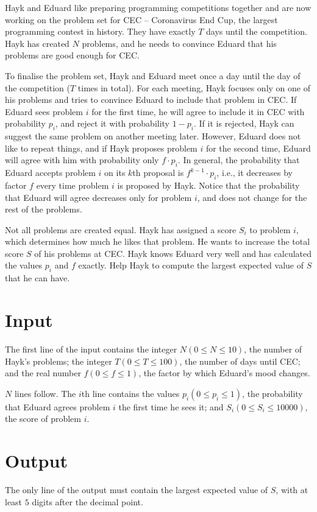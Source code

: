 Hayk and Eduard like preparing programming competitions together and are now working on the problem set for CEC -- Coronavirus End Cup, the largest programming contest in history.
They have exactly $T$ days until the competition.
Hayk has created $N$ problems, and he needs to convince Eduard that his problems are good enough for CEC.

To finalise the problem set, Hayk and Eduard meet once a day until the day of the competition ($T$ times in total).
For each meeting, Hayk focuses only on one of his problems and 
tries to convince Eduard to include that problem in CEC.
If Eduard sees problem $i$ for the first time, he will agree to include it in CEC with probability $p_i$, and reject it with probability $1 - p_i$.
If it is rejected, Hayk can suggest the same problem on another meeting later.
However, Eduard does not like to repeat things, and if Hayk proposes problem $i$
for the second time, Eduard will agree with him with probability only $f \cdot p_i$.
In general, the probability that Eduard accepts problem $i$ on its $k$th proposal is $f^{k-1}\cdot p_i$, i.e., it decreases by factor $f$ every time problem $i$ is proposed by Hayk.
Notice that the probability that Eduard will agree decreases only for problem $i$, and does not change for the rest of the problems.

Not all problems are created equal.
Hayk has assigned a score $S_i$ to problem $i$, which determines how much he likes that problem.
He wants to increase the total score $S$ of his problems at CEC.
Hayk knows Eduard very well and has calculated the values $p_i$ and $f$ exactly.
Help Hayk to compute the largest expected value of $S$ that he can have.

\section*{Input}
The first line of the input contains the integer $N (0 \leq N \leq 10)$, the number of Hayk's problems; the integer $T (0 \leq T \leq 100)$, the number of days until CEC; and the real number $f (0 \leq f \leq 1)$, the factor by which Eduard's mood changes.

$N$ lines follow.
The $i$th line contains the values $p_i (0 \leq p_i \leq 1)$, the probability that
Eduard agrees problem $i$ the first time he sees it;
and $S_i (0 \leq S_i \leq 10000)$, the score of problem $i$.

\section*{Output}
The only line of the output must contain the largest expected value of $S$, with at least $5$ digits after the decimal point.

